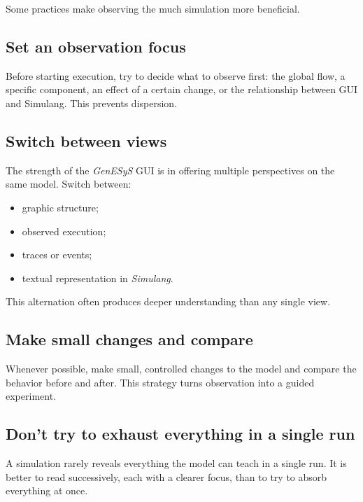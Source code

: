 Some practices make observing the much simulation more beneficial.

\subsection{Set an observation focus}
\label{subsec:cap5_defina_foco_observacao}

Before starting execution, try to decide what to observe first: the global flow, a specific component, an effect of a certain change, or the relationship between GUI and Simulang. This prevents dispersion.

\subsection{Switch between views}
\label{subsec:cap5_alterne_entre_visoes}

The strength of the \textit{GenESyS} GUI is in offering multiple perspectives on the same model. Switch between:
\begin{itemize}
\item graphic structure;
\item observed execution;
\item traces or events;
\item textual representation in \textit{Simulang}.
\end{itemize}

This alternation often produces deeper understanding than any single view.

\subsection{Make small changes and compare}
\label{subsec:cap5_pequenas_modificacoes_compare}

Whenever possible, make small, controlled changes to the model and compare the behavior before and after. This strategy turns observation into a guided experiment.

\subsection{Don't try to exhaust everything in a single run}
\label{subsec:cap5_nao_esgotar_tudo}

A simulation rarely reveals everything the model can teach in a single run. It is better to read successively, each with a clearer focus, than to try to absorb everything at once.

